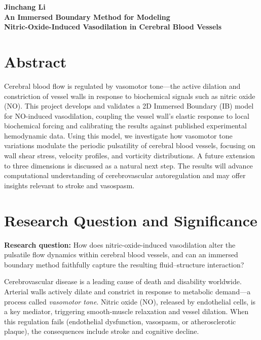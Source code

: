 \documentclass[12pt]{article}
\begin{document}
\begin{center}
    {\large \textbf{Jinchang Li}} \\[4pt]
    {\Large \textbf{An Immersed Boundary Method for Modeling\\
    Nitric-Oxide-Induced Vasodilation in Cerebral Blood Vessels}}
\end{center}

\section*{Abstract}

Cerebral blood flow is regulated by vasomotor tone---the active dilation and constriction of vessel walls in response to biochemical signals such as nitric oxide (NO). This project develops and validates a 2D Immersed Boundary (IB) model for NO-induced vasodilation, coupling the vessel wall's elastic response to local biochemical forcing and calibrating the results against published experimental hemodynamic data. Using this model, we investigate how vasomotor tone variations modulate the periodic pulsatility of cerebral blood vessels, focusing on wall shear stress, velocity profiles, and vorticity distributions. A future extension to three dimensions is discussed as a natural next step. The results will advance computational understanding of cerebrovascular autoregulation and may offer insights relevant to stroke and vasospasm.

\section*{Research Question and Significance}

\textbf{Research question:} How does nitric-oxide-induced vasodilation alter the pulsatile flow dynamics within cerebral blood vessels, and can an immersed boundary method faithfully capture the resulting fluid--structure interaction?

Cerebrovascular disease is a leading cause of death and disability worldwide. Arterial walls actively dilate and constrict in response to metabolic demand---a process called \textit{vasomotor tone}. Nitric oxide (NO), released by endothelial cells, is a key mediator, triggering smooth-muscle relaxation and vessel dilation. When this regulation fails (endothelial dysfunction, vasospasm, or atherosclerotic plaque), the consequences include stroke and cognitive decline.
\end{document}
